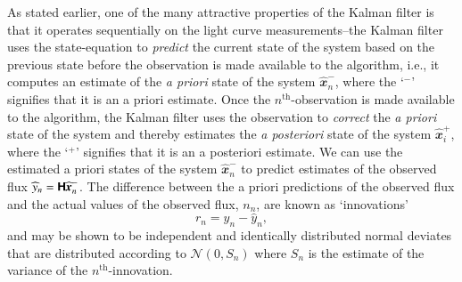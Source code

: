 \documentclass[a4paper,fleqn,usenatbib]{mnras}
\begin{document}
As stated earlier, one of the many attractive properties of the Kalman filter is that it operates sequentially on the light curve measurements--the Kalman filter uses the state-equation to \textit{predict} the current state of the system based on the previous state before the observation is made available to the algorithm, i.e., it computes an estimate of the \textit{a priori} state of the system $\widehat{\mathbfit{x}}^{-}_{n}$, where the `$^{-}$' signifies that it is an a priori estimate. Once the $n^{\mathrm{th}}$-observation is made available to the algorithm, the Kalman filter uses the observation to \textit{correct} the \textit{a priori} state of the system and thereby estimates the \textit{a posteriori} state of the system $\widehat{\mathbfit{x}}^{+}_{i}$, where the `$^{+}$' signifies that it is an a posteriori estimate. We can use the estimated a priori states of the system $\widehat{\mathbfit{x}}^{-}_{n}$ to predict estimates of the observed flux $\widehat{y}_{n} = \textbf{\textsf{H}}\widehat{\textbf{\textit{x}}}^{-}_{n}$. The difference between the a priori predictions of the observed flux and the actual values of the observed flux, $n_{n}$, are known as `innovations'
\begin{equation}\label{eq:InnovationPrelim}
r_{n} = y_{n} - \widehat{y}_{n},
\end{equation}
and may be shown to be independent and identically distributed normal deviates \citep[chapter 10.2]{Simon} that are distributed according to $\mathcal{N}(0,S_{n})$ where $S_{n}$ is the estimate of the variance of the $n^{\mathrm{th}}$-innovation. 
\end{document}
